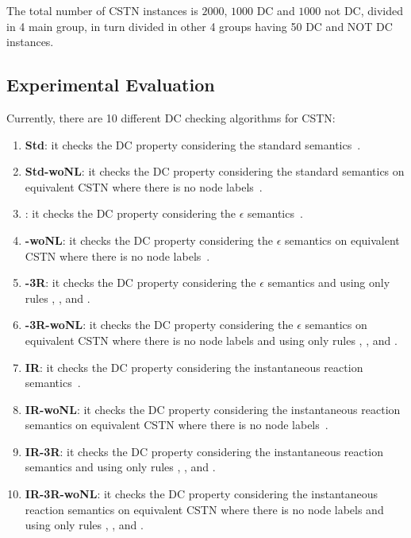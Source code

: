 \documentclass[a4paper,11pt]{article}
\begin{document}
The total number of CSTN instances is $2000$, $1000$ DC and $1000$ not DC, divided in 4 main group, in turn divided in other 4 groups having 50 DC and NOT DC instances.

  
\subsection{Experimental Evaluation}

Currently, there are 10 different DC checking algorithms for CSTN:
\begin{enumerate}
  \item \textbf{Std}: it checks the DC property considering the standard semantics~\cite{HunsbergerP16Icaps}.
  \item \textbf{Std-woNL}: it checks the DC property considering the standard semantics on equivalent CSTN where there is no node labels~\cite{CairoEtalTime2017}.
  \item \textbf{\textepsilon}: it checks the DC property considering the $\epsilon$ semantics~\cite{HunsbergerP16Icaps}.
  \item \textbf{\textepsilon-woNL}: it checks the DC property considering the $\epsilon$ semantics on equivalent CSTN where there is no node labels~\cite{CairoEtalTime2017}.
  \item \textbf{\textepsilon-3R}: it checks the DC property considering the $\epsilon$ semantics and using only rules \LP, \qRZero, and \qRThree.
  \item \textbf{\textepsilon-3R-woNL}: it checks the DC property considering the $\epsilon$ semantics on equivalent CSTN where there is no node labels and using only rules \LP, \qRZero, and \qRThree.
  \item \textbf{IR}: it checks the DC property considering the instantaneous reaction semantics~\cite{HunsbergerP16Icaps}.
  \item \textbf{IR-woNL}: it checks the DC property considering the instantaneous reaction semantics on equivalent CSTN where there is no node labels~\cite{CairoEtalTime2017}.
  \item \textbf{IR-3R}: it checks the DC property considering the instantaneous reaction semantics and using only rules \LP, \qRZero, and \qRThree.
  \item \textbf{IR-3R-woNL}: it checks the DC property considering the instantaneous reaction semantics on equivalent CSTN where there is no node labels and using only rules \LP, \qRZero, and \qRThree.
\end{enumerate} 
\end{document}

